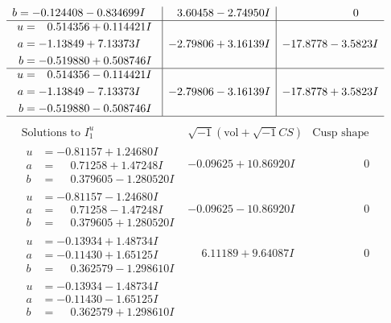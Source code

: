 \documentclass[1p]{elsarticle_modified}
\theoremstyle{definition}
\newcommand{\I}{\sqrt{-1}}
\begin{document}
$$\begin{array}{c|c|c}
\begin{aligned}
b &= -0.124408 - 0.834699 I\end{aligned}
 & \phantom{-}3.60458 - 2.74950 I & \phantom{-0.000000 } 0 \\ \hline\begin{aligned}
u &= \phantom{-}0.514356 + 0.114421 I \\
a &= -1.13849 + 7.13373 I \\
b &= -0.519880 + 0.508746 I\end{aligned}
 & -2.79806 + 3.16139 I & -17.8778 - 3.5823 I \\ \hline\begin{aligned}
u &= \phantom{-}0.514356 - 0.114421 I \\
a &= -1.13849 - 7.13373 I \\
b &= -0.519880 - 0.508746 I\end{aligned}
 & -2.79806 - 3.16139 I & -17.8778 + 3.5823 I\\
 \hline 
 \end{array}$$\newpage$$\begin{array}{c|c|c}  
\text{Solutions to }I^u_{1}& \I (\text{vol} + \sqrt{-1}CS) & \text{Cusp shape}\\
 \hline 
\begin{aligned}
u &= -0.81157 + 1.24680 I \\
a &= \phantom{-}0.71258 + 1.47248 I \\
b &= \phantom{-}0.379605 - 1.280520 I\end{aligned}
 & -0.09625 + 10.86920 I & \phantom{-0.000000 } 0 \\ \hline\begin{aligned}
u &= -0.81157 - 1.24680 I \\
a &= \phantom{-}0.71258 - 1.47248 I \\
b &= \phantom{-}0.379605 + 1.280520 I\end{aligned}
 & -0.09625 - 10.86920 I & \phantom{-0.000000 } 0 \\ \hline\begin{aligned}
u &= -0.13934 + 1.48734 I \\
a &= -0.11430 + 1.65125 I \\
b &= \phantom{-}0.362579 - 1.298610 I\end{aligned}
 & \phantom{-}6.11189 + 9.64087 I & \phantom{-0.000000 } 0 \\ \hline\begin{aligned}
u &= -0.13934 - 1.48734 I \\
a &= -0.11430 - 1.65125 I \\
b &= \phantom{-}0.362579 + 1.298610 I\end{aligned}

\end{array}$$
\end{document}
